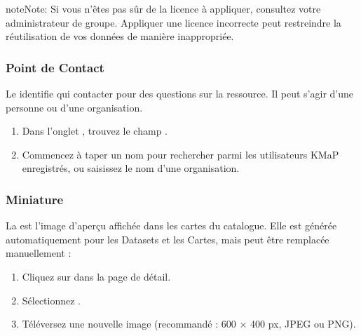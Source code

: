 \documentclass[letterpaper,10pt,english]{sphinxmanual}
\begin{document}
\begin{sphinxadmonition}{note}{Note:}
\sphinxAtStartPar
Si vous n’êtes pas sûr de la licence à appliquer, consultez votre administrateur
de groupe. Appliquer une licence incorrecte peut restreindre la réutilisation de
vos données de manière inappropriée.
\end{sphinxadmonition}


\subsubsection{Point de Contact}
\label{\detokenize{fr/03_gerer_metadonnees:point-de-contact}}
\sphinxAtStartPar
Le  identifie qui contacter pour des questions sur la ressource.
Il peut s’agir d’une personne ou d’une organisation.
\begin{enumerate}
%
\item {} 
\sphinxAtStartPar
Dans l’onglet , trouvez le champ .

\item {} 
\sphinxAtStartPar
Commencez à taper un nom pour rechercher parmi les utilisateurs KMaP enregistrés,
ou saisissez le nom d’une organisation.

\end{enumerate}


\subsubsection{Miniature}
\label{\detokenize{fr/03_gerer_metadonnees:miniature}}
\sphinxAtStartPar
La  est l’image d’aperçu affichée dans les cartes du catalogue. Elle est
générée automatiquement pour les Datasets et les Cartes, mais peut être remplacée
manuellement :
\begin{enumerate}
%
\item {} 
\sphinxAtStartPar
Cliquez sur  dans la page de détail.

\item {} 
\sphinxAtStartPar
Sélectionnez .

\item {} 
\sphinxAtStartPar
Téléversez une nouvelle image (recommandé : 600 × 400 px, JPEG ou PNG).

\end{enumerate}
\end{document}
